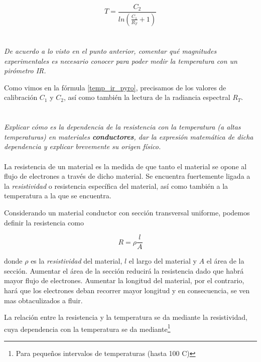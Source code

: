 \documentclass[10pt,a4paper]{article}
\begin{document}
			\begin{equation}\label{temp_ir_pyro}
				T = \frac{C_2}{ln\left( \frac{C_1}{R_T} + 1\right)}
			\end{equation}

	\section{}
		\textit{
		De acuerdo a lo visto en el punto anterior, comentar qué magnitudes experimentales es necesario conocer para poder medir la temperatura con un pirómetro IR.
		}

		Como vimos en la fórmula \ref{temp_ir_pyro}, precisamos de los valores de calibración $C_1$ y $C_2$, así como también la lectura de la radiancia espectral $R_T$.

	\section{}\label{item_f}
		\textit{
		Explicar cómo es la dependencia de la resistencia con la temperatura (a altas
		temperaturas) en materiales \textbf{conductores}, dar la expresión matemática de dicha
		dependencia y explicar brevemente su origen físico.
		}
		\\\\
		La resistencia de un material es la medida de que tanto el material se opone al flujo de electrones a través de dicho material. Se encuentra fuertemente ligada a la \textit{resistividad} o resistencia específica del material, así como también a la temperatura a la que se encuentra.

		Considerando un material conductor con sección transversal uniforme, podemos definir la resistencia como

		\begin{equation}\label{resistencia}
			R = \rho \frac{l}{A}
		\end{equation}

		donde $\rho$ es la \textit{resistividad} del material, $l$ el largo del material y $A$ el área de la sección. Aumentar el área de la sección reducirá la resistencia dado que habrá mayor flujo de electrones. Aumentar la longitud del material, por el contrario, hará que los electrones deban recorrer mayor longitud y en consecuencia, se ven mas obtaculizados a fluir.

		La relación entre la resistencia y la temperatura se da mediante la resistividad, cuya dependencia con la temperatura se da mediante\footnote{Para pequeños intervalos de temperaturas (hasta 100 \textdegree C)}
\end{document}
